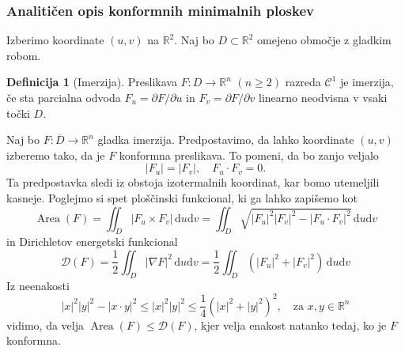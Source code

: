 \documentclass[8pt]{beamer}
\theoremstyle{definition}
\newtheorem{definicija}{Definicija}
\theoremstyle{remark}
\theoremstyle{plain}
\numberwithin{equation}{section}  %
\begin{document}
\begin{frame}
    \frametitle{Analitičen opis konformnih minimalnih ploskev}

    Izberimo koordinate $(u,v)$ na $\mathbb{R}^2$. Naj bo $D \subset \mathbb{R}^2$ omejeno območje z gladkim robom. 
    \begin{definicija}[Imerzija]
        Preslikava $F: D \rightarrow \mathbb{R}^n$ $(n \geq 2)$ razreda $\mathscr{C}^1$ je \textcolor{red1}{imerzija}, če sta parcialna odvoda $F_u=\partial F / \partial u$ in $F_v=\partial F / \partial v$ linearno neodvisna v vsaki točki $D$. 
    \end{definicija}
    Naj bo $F: \overline{D} \rightarrow \mathbb{R}^n$ gladka imerzija. Predpostavimo, da lahko koordinate $(u,v)$ izberemo tako, da je $F$ \textcolor{red1}{konformna preslikava}. To pomeni, da bo zanjo veljalo
    \begin{equation*}
        \left|F_u\right|=\left|F_v\right| , \quad F_u \cdot F_v=0.
    \end{equation*}
    Ta predpostavka sledi iz obstoja izotermalnih koordinat, kar bomo utemeljili kasneje. Poglejmo si spet \textcolor{red1}{ploščinski funkcional}, ki ga lahko zapišemo kot
    \begin{equation*}
        \operatorname{Area}(F)=\iint_D\left|F_u \times F_v\right| \, \mathrm{d} u \mathrm{d} v=\iint_D \sqrt{\left|F_u\right|^2\left|F_v\right|^2-\left|F_u \cdot F_v\right|^2} \, \mathrm{d} u \mathrm{d} v
    \end{equation*}
    in \textcolor{red1}{Dirichletov energetski funkcional}
    \begin{equation*}
        \mathscr{D}(F)=\frac{1}{2} \iint_D|\nabla F|^2 \, \mathrm{d} u \mathrm{d} v=\frac{1}{2} \iint_D\left(\left|F_u\right|^2+\left|F_v\right|^2\right) \, \mathrm{d} u \mathrm{d} v
    \end{equation*}
    Iz neenakosti 
    \begin{equation*}
        |x|^2|y|^2-|x \cdot y|^2 \leq|x|^2|y|^2 \leq \frac{1}{4}\left(|x|^2+|y|^2\right)^2, \quad \text{za }x, y \in \mathbb{R}^n         
    \end{equation*}
    vidimo, da velja $\operatorname{Area}(F) \leq \mathscr{D}(F)$, kjer velja enakost natanko tedaj, ko je $F$ konformna. 
    
\end{frame}
\end{document}

